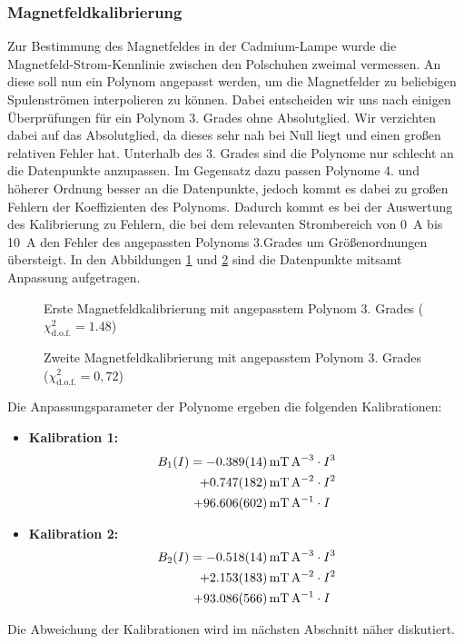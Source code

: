\documentclass[11pt, a4paper]{article}
\begin{document}
\subsubsection{Magnetfeldkalibrierung}
Zur Bestimmung des Magnetfeldes in der Cadmium-Lampe wurde die Magnetfeld-Strom-Kennlinie zwischen den Polschuhen zweimal vermessen.
An diese soll nun ein Polynom angepasst werden, um die Magnetfelder zu beliebigen Spulenströmen interpolieren zu können.
Dabei entscheiden wir uns nach einigen Überprüfungen für ein Polynom 3. Grades ohne Absolutglied.
Wir verzichten dabei auf das Absolutglied, da dieses sehr nah bei Null liegt und einen großen relativen Fehler hat.
Unterhalb des 3. Grades sind die Polynome nur schlecht an die Datenpunkte anzupassen.
Im Gegensatz dazu passen Polynome 4. und höherer Ordnung besser an die Datenpunkte, jedoch kommt es dabei zu großen Fehlern der Koeffizienten des Polynoms.
Dadurch kommt es bei der Auswertung des Kalibrierung zu Fehlern, die bei dem relevanten Strombereich von \SI{0}{\ampere} bis \SI{10}{\ampere} den Fehler des angepassten Polynoms 3.Grades um Größenordnungen übersteigt.
In den Abbildungen \ref{fig:kalibrierung1} und \ref{fig:kalibrierung2} sind die Datenpunkte mitsamt Anpassung aufgetragen.
\begin{figure}[h]
\centering

\caption{Erste Magnetfeldkalibrierung mit angepasstem Polynom 3. Grades ($\chi_\mathrm{d.o.f.}^2= \num{1,48}$)}
\label{fig:kalibrierung1}
\end{figure}
\begin{figure}[h]
\centering

\caption{Zweite Magnetfeldkalibrierung mit angepasstem Polynom 3. Grades ($\chi_\mathrm{d.o.f.}^2=0,72$)}
\label{fig:kalibrierung2}
\end{figure}
Die Anpassungsparameter der Polynome ergeben die folgenden Kalibrationen:
\begin{itemize}
	\item \textbf{Kalibration 1:}
	\begin{align*}
	B_1(I) = \SI{-0.389 +- 0.014}{\milli\tesla\per\ampere\cubed} &\cdot I^3 \nonumber\\
	+\SI{0.747+-0.182}{\milli\tesla\per\ampere\squared} &\cdot I^2 \nonumber\\
	+ \SI{96.606 +- 0.602}{\milli\tesla\per\ampere} &\cdot I
	\end{align*}
	\item \textbf{Kalibration 2:}
	\begin{align*}
	B_2(I) = \SI{-0.518 +- 0.014}{\milli\tesla\per\ampere\cubed} &\cdot I^3 \nonumber\\
	+\SI{2.153+-0.183}{\milli\tesla\per\ampere\squared} &\cdot I^2 \nonumber\\
	+ \SI{93.086 +- 0.566}{\milli\tesla\per\ampere} &\cdot I
	\end{align*}
\end{itemize}
Die Abweichung der Kalibrationen wird im nächsten Abschnitt näher diskutiert.
\end{document}
